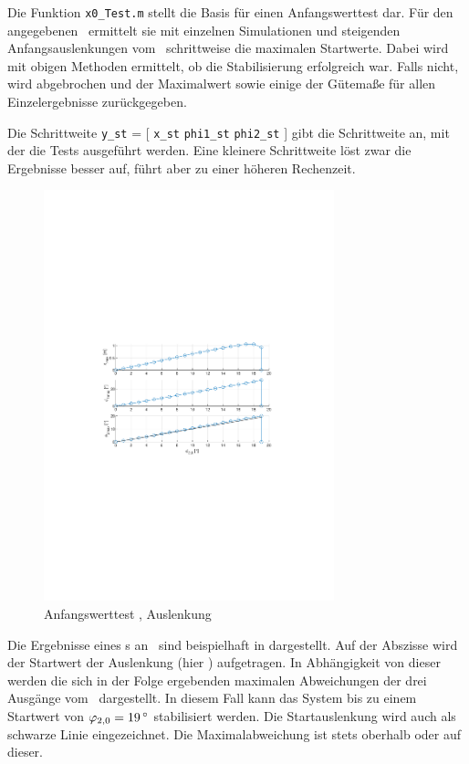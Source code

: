 Die Funktion \texttt{x0\_Test.m} stellt die Basis für einen Anfangswerttest dar.
Für den angegebenen \ap\ ermittelt sie mit einzelnen Simulationen und steigenden Anfangsauslenkungen vom \ap\ schrittweise die maximalen Startwerte.
Dabei wird mit obigen Methoden ermittelt, ob die Stabilisierung erfolgreich war.
Falls nicht, wird abgebrochen und der Maximalwert sowie einige der Gütemaße für allen Einzelergebnisse zurückgegeben.

Die Schrittweite \texttt{y\_st} = [ \texttt{x\_st} \texttt{phi1\_st} \texttt{phi2\_st} ] gibt die Schrittweite an, mit der die Tests ausgeführt werden.
Eine kleinere Schrittweite löst zwar die Ergebnisse besser auf, führt aber zu einer höheren Rechenzeit.

\begin{figure}[hb]
	\centering
		\includegraphics[width=0.75\textwidth]{Bilder/x0test/appr-x0-ap42.pdf}
	\caption{Anfangswerttest \apv, Auslenkung \phz}
	\label{fig:x0test}
\end{figure}

Die Ergebnisse eines \xots s an \apv\ sind beispielhaft in  dargestellt.
Auf der Abszisse wird der Startwert der Auslenkung (hier \phz) aufgetragen.
In Abhängigkeit von dieser werden die sich in der Folge ergebenden maximalen Abweichungen der drei Ausgänge vom \ap\ dargestellt.
In diesem Fall kann das System bis zu einem Startwert von $\phzo=\valdeg{19}$ stabilisiert werden.
Die Startauslenkung wird auch als schwarze Linie eingezeichnet. 
Die Maximalabweichung ist stets oberhalb oder auf dieser.


